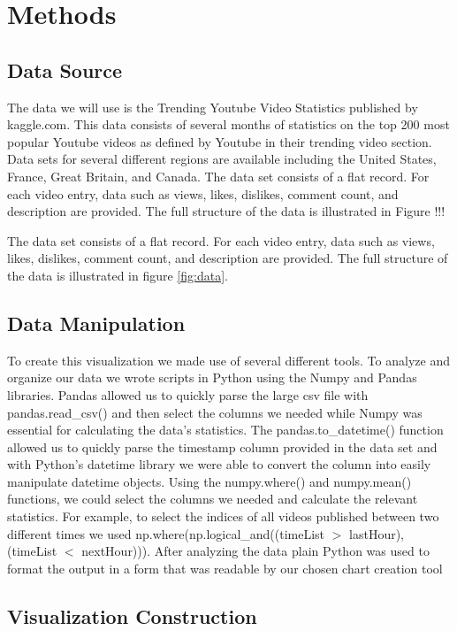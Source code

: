 \documentclass[journal]{vgtc}                %
\begin{document}
\section{Methods}

\subsection{Data Source}
The data we will use is the Trending Youtube Video Statistics published by kaggle.com. This data consists of several months of statistics on the top 200 most popular Youtube videos as defined by Youtube in their trending video section. Data sets for several different regions are available including the United States, France, Great Britain, and Canada. 
The data set consists of a flat record. For each video entry, data such as views, likes, dislikes, comment count, and description are provided. The full structure of the data is illustrated in Figure !!!  

The data set consists of a flat record. For each video entry, data such as views, likes, dislikes, comment count, and description are provided. The full structure of the data is illustrated in figure \ref{fig:data}.

\subsection{Data Manipulation}
To create this visualization we made use of several different tools. To analyze and organize our data we wrote scripts in Python using the Numpy and Pandas libraries. Pandas allowed us to quickly parse the large csv file with pandas.read\_csv() and then select the columns we needed while Numpy was essential for calculating the data's statistics. The pandas.to\_datetime() function allowed us to quickly parse the timestamp column provided in the data set and with Python's datetime library we were able to convert the column into easily manipulate datetime objects.  Using the numpy.where() and numpy.mean() functions, we could select the columns we needed and calculate the relevant statistics. For example, to select the indices of all videos published between two different times we used np.where(np.logical\_and((timeList $>$ lastHour),  (timeList $<$ nextHour))). After analyzing the data plain Python was used to format the output in a form that was readable by our chosen chart creation tool

\subsection{Visualization Construction}
\end{document}
